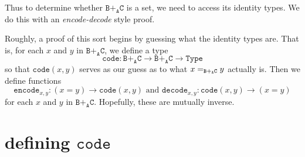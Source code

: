 \message{ !name(notes.tex)}\documentclass[12pt]{amsart}
\newcommand{\from}{\colon}
\newcommand{\type}[1]{\mathtt{#1}}
\newcommand{\A}{\type{A}}
\newcommand{\B}{\type{B}}
\newcommand{\C}{\type{C}}
\newcommand{\BAC}{\B +_{\A} \C}
\newcommand{\Type}{\type{Type}}
\newcommand{\code}{\type{code}}
\theoremstyle{remark}
\theoremstyle{definition}
\begin{document}
Thus to determine whether $\BAC$ is a set,
we need to access its identity types.  
We do this with an \emph{encode-decode} style proof.  

Roughly, a proof of this sort begins by guessing
what the identity types are.  That is,
for each $x$ and $y$ in $\BAC$, 
we define a type 
\[
	\code \from \BAC \to \BAC\to \Type
\]
so that $\code (x,y)$ serves as our guess  
as to what $x =_{\scriptsize \BAC} y$ actually is.  
Then we define functions
\[
	\type{ encode }_{ x , y } \from  ( x = y ) \to \code ( x , y ) 
	\text{ and }
	\type{ decode }_{ x , y } \from \code ( x , y ) \to ( x = y )
\]
for each $x$ and $y$ in $\BAC$.  
Hopefully, these are mutually inverse.

\pagebreak


\section{defining $\code$}
\end{document}

